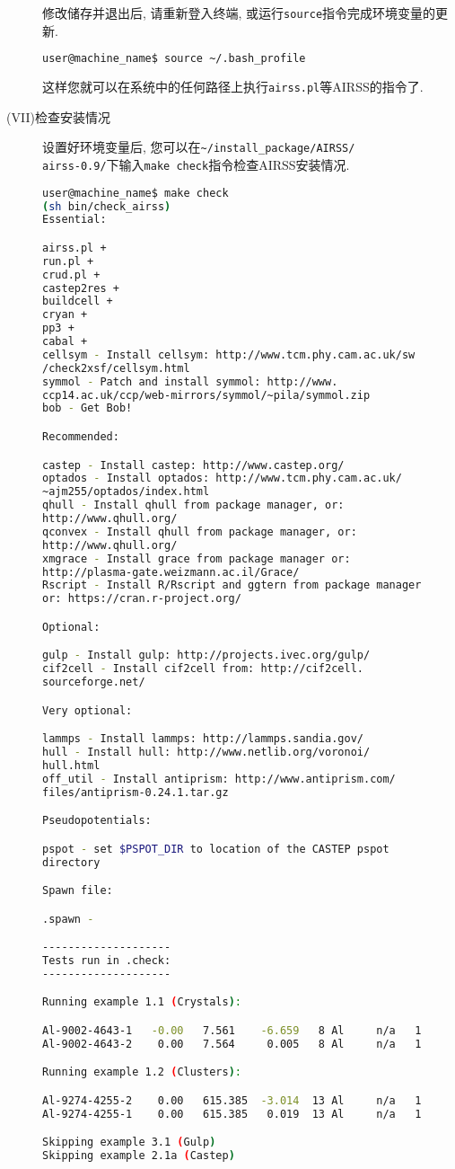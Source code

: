 \documentclass[a4paper, 10pt]{article}
\begin{document}
\begin{description}
        修改储存并退出后, 请重新登入终端, 或运行\verb|source|指令完成环境变量的更新.
        \begin{lstlisting}[language={bash}]
user@machine_name$ source ~/.bash_profile 
        \end{lstlisting}

        这样您就可以在系统中的任何路径上执行\verb|airss.pl|等AIRSS的指令了.

        \item[(VII)检查安装情况] 设置好环境变量后, 您可以在\verb|~/install_package/AIRSS/|
        \\\verb|airss-0.9/|下输入\verb|make check|指令检查AIRSS安装情况. 
        \begin{lstlisting}[language={bash}]
user@machine_name$ make check
(sh bin/check_airss)
Essential:

airss.pl +
run.pl +
crud.pl +
castep2res +
buildcell +
cryan +
pp3 +
cabal +
cellsym - Install cellsym: http://www.tcm.phy.cam.ac.uk/sw
/check2xsf/cellsym.html
symmol - Patch and install symmol: http://www.
ccp14.ac.uk/ccp/web-mirrors/symmol/~pila/symmol.zip
bob - Get Bob!

Recommended:

castep - Install castep: http://www.castep.org/
optados - Install optados: http://www.tcm.phy.cam.ac.uk/
~ajm255/optados/index.html
qhull - Install qhull from package manager, or: 
http://www.qhull.org/
qconvex - Install qhull from package manager, or: 
http://www.qhull.org/
xmgrace - Install grace from package manager or: 
http://plasma-gate.weizmann.ac.il/Grace/
Rscript - Install R/Rscript and ggtern from package manager
or: https://cran.r-project.org/

Optional:

gulp - Install gulp: http://projects.ivec.org/gulp/
cif2cell - Install cif2cell from: http://cif2cell.
sourceforge.net/

Very optional:

lammps - Install lammps: http://lammps.sandia.gov/
hull - Install hull: http://www.netlib.org/voronoi/
hull.html
off_util - Install antiprism: http://www.antiprism.com/
files/antiprism-0.24.1.tar.gz

Pseudopotentials:

pspot - set $PSPOT_DIR to location of the CASTEP pspot 
directory

Spawn file:

.spawn - 

--------------------
Tests run in .check:
--------------------

Running example 1.1 (Crystals):

Al-9002-4643-1   -0.00   7.561    -6.659   8 Al     n/a   1
Al-9002-4643-2    0.00   7.564     0.005   8 Al     n/a   1

Running example 1.2 (Clusters):

Al-9274-4255-2    0.00   615.385  -3.014  13 Al     n/a   1
Al-9274-4255-1    0.00   615.385   0.019  13 Al     n/a   1

Skipping example 3.1 (Gulp)
Skipping example 2.1a (Castep)
        \end{lstlisting}       
      \end{description}
\end{document}
